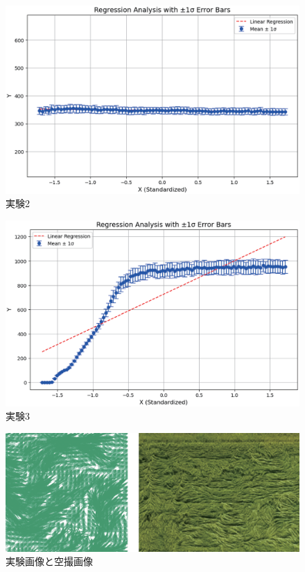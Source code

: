 \documentclass[twocolumn]{jarticle}
\begin{document}
\begin{figure}[tb]
    \centering
    \includegraphics[width=\linewidth]{fig/e2.eps}
    \caption{実験2}
    \label{fig:e2}
\end{figure}

\begin{figure}[tb]
    \centering
    \includegraphics[width=\linewidth]{fig/e3.eps}
    \caption{実験3}
    \label{fig:e3}
\end{figure}

\begin{figure}[tb]
    \includegraphics[width=\linewidth]{fig/comparison.eps}
    \caption{実験画像と空撮画像}
    \label{fig:disp1}
\end{figure}
\end{document}
